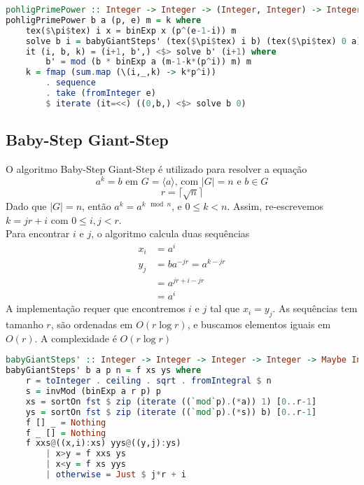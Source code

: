 \documentclass{article}
\begin{document}
\noindent\hspace{0.03\linewidth}
\begin{minipage}{.9\linewidth}
\begin{lstlisting}[language=haskell,caption=Pohlig Prime Power]
pohligPrimePower :: Integer -> Integer -> (Integer, Integer) -> Integer -> Maybe Integer
pohligPrimePower b a (p, e) m = k where
    tex($\pi$tex) i x = binExp x (p^(e-1-i)) m
    solve b i = babyGiantSteps' (tex($\pi$tex) i b) (tex($\pi$tex) 0 a) m p
    it (i, b, k) = (i+1, b',) <$> solve b' (i+1) where
        b' = mod (b * binExp a (m-1-k*(p^i)) m) m
    k = fmap (sum.map (\(i,_,k) -> k*p^i))
        . sequence
        . take (fromInteger e)
        $ iterate (it=<<) ((0,b,) <$> solve b 0)
\end{lstlisting}
\end{minipage}

\subsection{Baby-Step Giant-Step}
O algoritmo Baby-Step Giant-Step é utilizado para resolver a equação
$$ a^k = b \text{ em } G = \langle a \rangle\text{, com }|G| = n\text{ e }b \in G$$
$$ r = \lceil \sqrt{n} \rceil $$
Dado que $ |G| = n $, então $ a^k = a^{k \mod n} $, e $ 0 \leq k < n $. Assim, re-escrevemos $ k = j r + i $ com $ 0 \leq i, j < r $.\\
Para encontrar $i$ e $j$, o algoritmo calcula duas sequências
\begin{align*}
    x_i &= a^i\\
    y_j &= b a^{-j r} = a^{k - j r}\\
        &= a^{j r + i - j r}\\
        &= a^{i}
\end{align*}
A implementação requer que encontremos $i$ e $j$ tal que $x_i = y_j$. As sequências tem tamanho $r$, são ordenadas em $O(r \log r)$, e buscamos elementos iguais em $O(r)$. A complexidade é $O(r \log r)$

\noindent\hspace{0.03\linewidth}
\begin{minipage}{.9\linewidth}
\begin{lstlisting}[language=haskell,caption=Baby-Steps Giant-Steps]
babyGiantSteps' :: Integer -> Integer -> Integer -> Integer -> Maybe Integer
babyGiantSteps' b a p n = f xs ys where
    r = toInteger . ceiling . sqrt . fromIntegral $ n
    s = invMod (binExp a r p) p
    xs = sortOn fst $ zip (iterate ((`mod`p).(*a)) 1) [0..r-1]
    ys = sortOn fst $ zip (iterate ((`mod`p).(*s)) b) [0..r-1]
    f [] _ = Nothing
    f _ [] = Nothing
    f xxs@((x,i):xs) yys@((y,j):ys)
        | x>y = f xxs ys
        | x<y = f xs yys
        | otherwise = Just $ j*r + i
\end{lstlisting}
\end{minipage}
\end{document}
